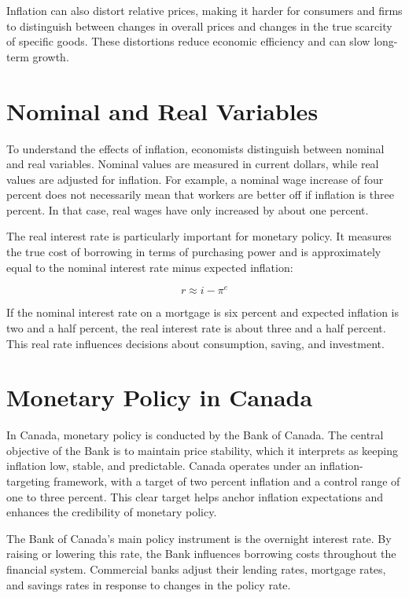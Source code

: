 \documentclass[12pt]{article}
\begin{document}
Inflation can also distort relative prices, making it harder for consumers and firms to distinguish between changes in overall prices and changes in the true scarcity of specific goods. These distortions reduce economic efficiency and can slow long-term growth.

\section{Nominal and Real Variables}

To understand the effects of inflation, economists distinguish between nominal and real variables. Nominal values are measured in current dollars, while real values are adjusted for inflation. For example, a nominal wage increase of four percent does not necessarily mean that workers are better off if inflation is three percent. In that case, real wages have only increased by about one percent.

The real interest rate is particularly important for monetary policy. It measures the true cost of borrowing in terms of purchasing power and is approximately equal to the nominal interest rate minus expected inflation:

\[
r \approx i - \pi^e
\]

If the nominal interest rate on a mortgage is six percent and expected inflation is two and a half percent, the real interest rate is about three and a half percent. This real rate influences decisions about consumption, saving, and investment.

\section{Monetary Policy in Canada}

In Canada, monetary policy is conducted by the Bank of Canada. The central objective of the Bank is to maintain price stability, which it interprets as keeping inflation low, stable, and predictable. Canada operates under an inflation-targeting framework, with a target of two percent inflation and a control range of one to three percent. This clear target helps anchor inflation expectations and enhances the credibility of monetary policy.

The Bank of Canada’s main policy instrument is the overnight interest rate. By raising or lowering this rate, the Bank influences borrowing costs throughout the financial system. Commercial banks adjust their lending rates, mortgage rates, and savings rates in response to changes in the policy rate.
\newpage
\end{document}
